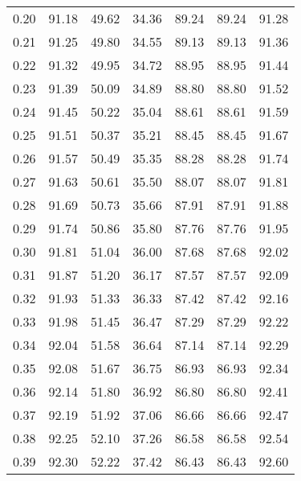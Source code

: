 \begin{tabular}{|c|c|c|c|c|c|c|}
      0.20 &     91.18 &     49.62 &      34.36 &   89.24 &      89.24 &         91.28 \\
      0.21 &     91.25 &     49.80 &      34.55 &   89.13 &      89.13 &         91.36 \\
      0.22 &     91.32 &     49.95 &      34.72 &   88.95 &      88.95 &         91.44 \\
      0.23 &     91.39 &     50.09 &      34.89 &   88.80 &      88.80 &         91.52 \\
      0.24 &     91.45 &     50.22 &      35.04 &   88.61 &      88.61 &         91.59 \\
      0.25 &     91.51 &     50.37 &      35.21 &   88.45 &      88.45 &         91.67 \\
      0.26 &     91.57 &     50.49 &      35.35 &   88.28 &      88.28 &         91.74 \\
      0.27 &     91.63 &     50.61 &      35.50 &   88.07 &      88.07 &         91.81 \\
      0.28 &     91.69 &     50.73 &      35.66 &   87.91 &      87.91 &         91.88 \\
      0.29 &     91.74 &     50.86 &      35.80 &   87.76 &      87.76 &         91.95 \\
      0.30 &     91.81 &     51.04 &      36.00 &   87.68 &      87.68 &         92.02 \\
      0.31 &     91.87 &     51.20 &      36.17 &   87.57 &      87.57 &         92.09 \\
      0.32 &     91.93 &     51.33 &      36.33 &   87.42 &      87.42 &         92.16 \\
      0.33 &     91.98 &     51.45 &      36.47 &   87.29 &      87.29 &         92.22 \\
      0.34 &     92.04 &     51.58 &      36.64 &   87.14 &      87.14 &         92.29 \\
      0.35 &     92.08 &     51.67 &      36.75 &   86.93 &      86.93 &         92.34 \\
      0.36 &     92.14 &     51.80 &      36.92 &   86.80 &      86.80 &         92.41 \\
      0.37 &     92.19 &     51.92 &      37.06 &   86.66 &      86.66 &         92.47 \\
      0.38 &     92.25 &     52.10 &      37.26 &   86.58 &      86.58 &         92.54 \\
      0.39 &     92.30 &     52.22 &      37.42 &   86.43 &      86.43 &         92.60 \\

\end{tabular}
